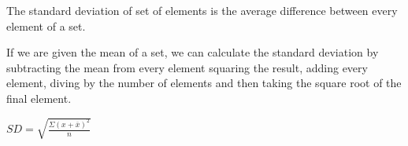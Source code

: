 \documentclass[a4paper, 12pt]{article}
\begin{document}
The standard deviation of set of elements is the
average difference between every element of a set.

If we are given the mean of a set, we can calculate the
standard deviation by subtracting the mean from every element
squaring the result, adding every element, diving by the number
of elements and then taking the square root of the final element.



$SD = \sqrt{\frac{\Sigma(x + \overline{x})^2}{n}}$
\end{document}
